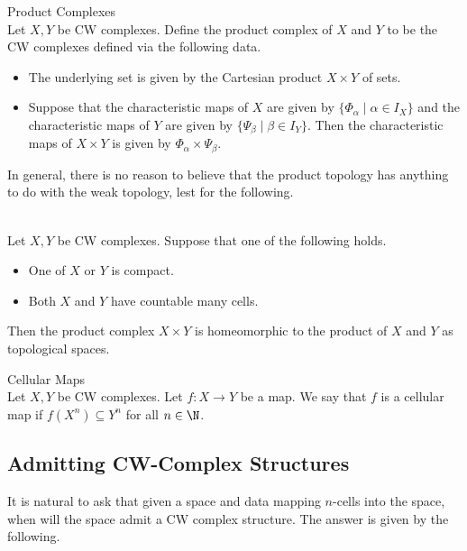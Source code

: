\documentclass[a4paper]{article}
\begin{document}
\begin{defn}{Product Complexes}{}\\
Let $X,Y$ be CW complexes. Define the product complex of $X$ and $Y$ to be the CW complexes defined via the following data. 
\begin{itemize}
\item The underlying set is given by the Cartesian product $X\times Y$ of sets. 
\item Suppose that the characteristic maps of $X$ are given by $\{\Phi_\alpha\;|\;\alpha\in I_X\}$ and the characteristic maps of $Y$ are given by $\{\Psi_\beta\;|\;\beta\in I_Y\}$. Then the characteristic maps of $X\times Y$ is given by $\Phi_\alpha\times\Psi_\beta$. 
\end{itemize}
\end{defn}

In general, there is no reason to believe that the product topology has anything to do with the weak topology, lest for the following. 

\begin{prp}{}{}\\
Let $X,Y$ be CW complexes. Suppose that one of the following holds. 
\begin{itemize}
\item One of $X$ or $Y$ is compact. 
\item Both $X$ and $Y$ have countable many cells. 
\end{itemize}
Then the product complex $X\times Y$ is homeomorphic to the product of $X$ and $Y$ as topological spaces. 
\end{prp}

\begin{defn}{Cellular Maps}{}\\
Let $X,Y$ be CW complexes. Let $f:X\to Y$ be a map. We say that $f$ is a cellular map if $f(X^n)\subseteq Y^n$ for all $n\in\N$. 
\end{defn}

\subsection{Admitting CW-Complex Structures}
It is natural to ask that given a space and data mapping $n$-cells into the space, when will the space admit a CW complex structure. The answer is given by the following. 
\end{document}
